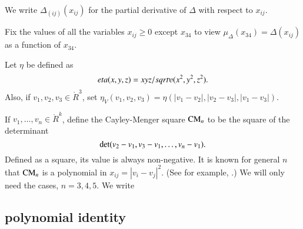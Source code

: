 \begin{tarskidata}
\begin{tarski}
We write $\Delta_{(ij)}(x_{ij})$ for the partial derivative of $\Delta$
with respect to $x_{ij}$.

Fix the values of all the variables $x_{ij}\ge 0$ except
$x_{34}$ to view $\mu_\Delta(x_{34})=\Delta(x_{ij})$ as a function of $x_{34}$.  %
\end{tarski}





\begin{tarski}

\begin{definition}
%
Let $\eta$ be defined as
	$$\eta(x,y,z) = x y z/\sqrt{\ups(x^2,y^2,z^2)}.$$
Also, if $v_1,v_2,v_3\in\ring{R}^3$, set
   $\eta_V(v_1,v_2,v_3) =\eta(|v_1-v_2|,|v_2-v_3|,|v_1-v_3|)$.
\end{definition}
\end{tarski}

\begin{tarski}

\begin{definition}
If $v_1,\ldots,v_n\in\ring{R}^k$, define
the Cayley-Menger square ${\operatorname{CM}}_n$
to be the square
of the determinant
	$${\operatorname{det}}(v_2-v_1,v_3-v_1,\ldots,v_n-v_1).$$
Defined as a square, its value is always non-negative.
It is known for general $n$ that ${\operatorname{CM}}_n$ is a polynomial in
$x_{ij} = |v_i-v_j|^2$.  (See for example,
\cite{EZ}.)
We will only need the cases, $n=3,4,5$.   We write
\end{definition}
\end{tarski}


\begin{tarski}
\subsection{polynomial identity}



\end{tarski}
\end{tarskidata}
